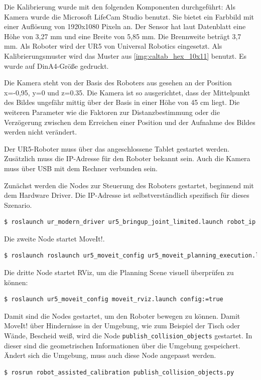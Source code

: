Die Kalibrierung wurde mit den folgenden Komponenten durchgeführt: Als Kamera wurde die Microsoft LifeCam Studio benutzt. Sie bietet ein Farbbild mit einer Auflösung von 1920x1080 Pixeln an. Der Sensor hat laut Datenblatt eine Höhe von 3,27 mm und eine Breite von 5,85 mm. Die Brennweite beträgt 3,7 mm. Als Roboter wird der UR5 von Universal Robotics eingesetzt. Als Kalibrierungsmuster wird das Muster aus \autoref{img:caltab_hex_10x11} benutzt. Es wurde auf DinA4-Größe gedruckt.

Die Kamera steht von der Basis des Roboters aus gesehen an der Position x=-0,95, y=0 und z=0.35. Die Kamera ist so ausgerichtet, dass der Mittelpunkt des Bildes ungefähr mittig über der Basis in einer Höhe von 45 cm liegt. Die weiteren Parameter wie die Faktoren zur Distanzbestimmung oder die Verzögerung zwischen dem Erreichen einer Position und der Aufnahme des Bildes werden nicht verändert.

Der UR5-Roboter muss über das angeschlossene Tablet gestartet werden. Zusätzlich muss die IP-Adresse für den Roboter bekannt sein. Auch die Kamera muss über USB mit dem Rechner verbunden sein.

Zunächst werden die Nodes zur Steuerung des Roboters gestartet, beginnend mit dem Hardware Driver. Die IP-Adresse ist selbstverständlich spezifisch für dieses Szenario.
\begin{lstlisting}[language=bash]
  $ roslaunch ur_modern_driver ur5_bringup_joint_limited.launch robot_ip:=192.168.102.95
\end{lstlisting}
Die zweite Node startet MoveIt!.
\begin{lstlisting}[language=bash]
  $ roslaunch roslaunch ur5_moveit_config ur5_moveit_planning_execution.launch limited:=true
\end{lstlisting}
Die dritte Node startet RViz, um die Planning Scene visuell überprüfen zu können:
\begin{lstlisting}[language=bash]
  $ roslaunch ur5_moveit_config moveit_rviz.launch config:=true
\end{lstlisting}

Damit sind die Nodes gestartet, um den Roboter bewegen zu können. Damit MoveIt! über Hindernisse in der Umgebung, wie zum Beispiel der Tisch oder Wände, Bescheid weiß, wird die Node \texttt{publish\_collision\_objects} gestartet. In dieser sind die geometrischen Informationen über die Umgebung gespeichert. Ändert sich die Umgebung, muss auch diese Node angepasst werden.
\begin{lstlisting}[language=bash]
  $ rosrun robot_assisted_calibration publish_collision_objects.py
\end{lstlisting}

